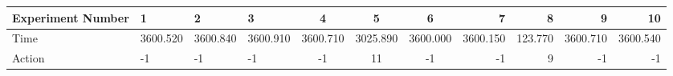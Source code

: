 \documentclass[8pt]{article}
\begin{document}
\begin{landscape}
\begin{tabular}{ | l | l | l | l | c | c | c | r | r | r | r | }
 \hline 
Experiment Number & 1 & 2 & 3 & 4 & 5 & 6 & 7 & 8 & 9 & 10\\ \hline
Time & 3600.520 & 3600.840 & 3600.910 & 3600.710 & 3025.890 & 3600.000 & 3600.150 & 123.770 & 3600.710 & 3600.540\\ \hline
Action & -1 & -1 & -1 & -1 & 11 & -1 & -1 & 9 & -1 & -1\\ \hline\end{tabular}
\end{landscape}
\end{document}
